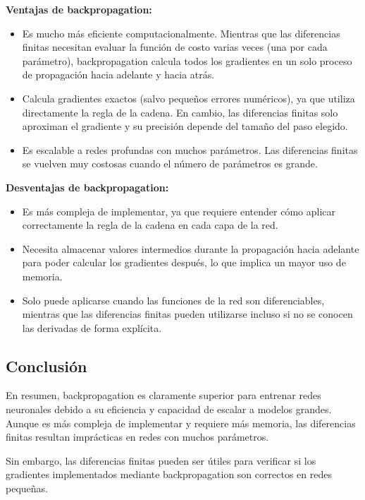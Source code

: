 \documentclass{article}
\begin{document}
\textbf{Ventajas de backpropagation:}
\begin{itemize}
    \item Es mucho más eficiente computacionalmente. Mientras que las diferencias finitas necesitan evaluar la función de costo varias veces (una por cada parámetro), backpropagation calcula todos los gradientes en un solo proceso de propagación hacia adelante y hacia atrás.
    \item Calcula gradientes exactos (salvo pequeños errores numéricos), ya que utiliza directamente la regla de la cadena. En cambio, las diferencias finitas solo aproximan el gradiente y su precisión depende del tamaño del paso elegido.
    \item Es escalable a redes profundas con muchos parámetros. Las diferencias finitas se vuelven muy costosas cuando el número de parámetros es grande.
\end{itemize}

\textbf{Desventajas de backpropagation:}
\begin{itemize}
    \item Es más compleja de implementar, ya que requiere entender cómo aplicar correctamente la regla de la cadena en cada capa de la red.
    \item Necesita almacenar valores intermedios durante la propagación hacia adelante para poder calcular los gradientes después, lo que implica un mayor uso de memoria.
    \item Solo puede aplicarse cuando las funciones de la red son diferenciables, mientras que las diferencias finitas pueden utilizarse incluso si no se conocen las derivadas de forma explícita.
\end{itemize}

\subsection{Conclusión}

En resumen, backpropagation es claramente superior para entrenar redes neuronales debido a su eficiencia y capacidad de escalar a modelos grandes. Aunque es más compleja de implementar y requiere más memoria, las diferencias finitas resultan imprácticas en redes con muchos parámetros.

Sin embargo, las diferencias finitas pueden ser útiles para verificar si los gradientes implementados mediante backpropagation son correctos en redes pequeñas.


\end{document}
